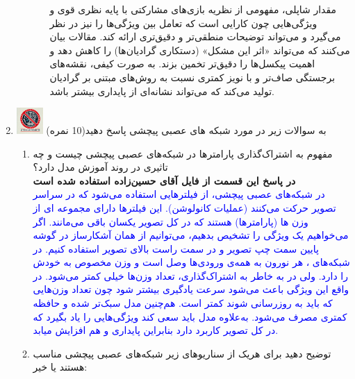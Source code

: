 \documentclass[12pt]{article}
\begin{document}
\begin{enumerate}
\begin{enumerate}
\begin{itemize}
{            مقدار شاپلی، مفهومی از نظریه بازی‌های مشارکتی با پایه نظری قوی و ویژگی‌هایی چون کارایی  است که تعامل بین ویژگی‌ها را نیز در نظر می‌گیرد و می‌تواند توضیحات منطقی‌تر و دقیق‌تری ارائه کند.
            مقالات بیان می‌کنند که  می‌تواند «اثر این مشکل» (دستکاری گرادیان‌ها) را کاهش دهد و اهمیت پیکسل‌ها را دقیق‌تر تخمین بزند.
            به صورت کیفی،  نقشه‌های برجستگی  صاف‌تر و با نویز کمتری نسبت به روش‌های مبتنی بر گرادیان تولید می‌کند که می‌تواند نشانه‌ای از پایداری بیشتر باشد.
             }
         \end{itemize}
     \end{enumerate}
     \vspace{1cm}

    \item \includegraphics[width=1cm]{figs/Forbidden_AI.jpg}
    به سوالات زیر در مورد شبکه های عصبی پیچشی پاسخ دهید(10 نمره)\\
    \begin{enumerate}
        \item مفهوم به اشتراک‌گذاری پارامترها در شبکه‌های عصبی پیچشی چیست و چه تاثیری در روند آموزش مدل دارد؟\\
        \textbf{در پاسخ این قسمت از فایل آقای حسین‌زاده استفاده شده است}\\
        \textcolor{blue}{
        در شبکه‌های عصبی پیچشی، از فیلترهایی استفاده می‌شود که در سراسر تصویر حرکت می‌کنند (عملیات کانولوشن). این فیلترها دارای مجموعه ای از وزن ها (پارامترها) هستند که در کل تصویر یکسان باقی می‌مانند. اگر می‌خواهیم یک ویژگی را تشخیص بدهیم، می‌توانیم از همان آشکارساز در گوشه پایین سمت چپ تصویر و در سمت راست بالای تصویر استفاده کنیم. در شبکه‌های ، هر نورون به همه‌ی ورودی‌ها وصل است و وزن مخصوص به خودش را دارد. ولی در   به خاطر به اشتراک‌گذاری، تعداد وزن‌ها خیلی کمتر می‌شود. در واقع این ویژگی باعث می‌شود سرعت یادگیری بیشتر شود چون تعداد وزن‌هایی که باید به روزرسانی شوند کمتر است. هم‌چنین مدل سبک‌تر شده و حافظه کمتری مصرف می‌شود. به‌علاوه مدل باید سعی کند ویژگی‌هایی را یاد بگیرد که در کل تصویر کاربرد دارد بنابراین پایداری و  هم افزایش میابد.
        }
        \item توضیح دهید برای هریک از سناریوهای زیر شبکه‌های عصبی پیچشی مناسب هستند یا خیر:
        \begin{itemize}

\end{itemize}
\end{enumerate}
\end{enumerate}
\end{document}
